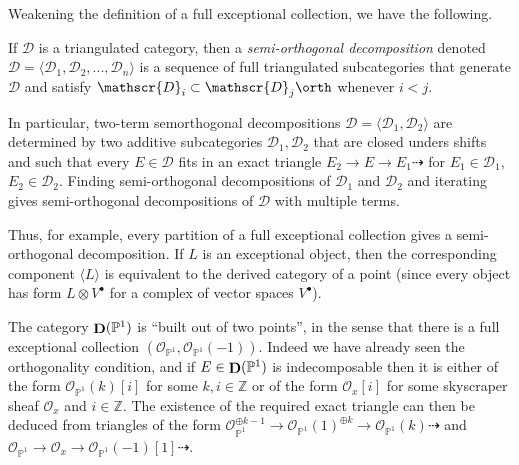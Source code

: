 Weakening the definition of a full exceptional collection, we have the
following.

\begin{definition}
    If \(\mathscr{D}\) is a triangulated category, then a
    \textit{semi-orthogonal decomposition} denoted \(\mathscr{D}=\langle
    \mathscr{D}_1,\mathscr{D}_2,...,\mathscr{D}_n\rangle\) is a sequence of full
    triangulated subcategories that generate \(\mathscr{D}\) and satisfy
    \(\mathscr{D}_i\subset \mathscr{D}_j\orth\) whenever \(i<j\).
\end{definition}

In particular, two-term semorthogonal decompositions \(\mathscr{D}=\langle
\mathscr{D}_1,\mathscr{D}_2\rangle\) are determined by two additive subcategories
\(\mathscr{D}_1,\mathscr{D}_2\) that are closed unders shifts and such that
every \(E\in \mathscr{D}\) fits in an exact triangle \( E_2\to E\to
E_1\dashrightarrow\) for \(E_1\in \mathscr{D}_1\), \(E_2\in \mathscr{D}_2\). Finding
semi-orthogonal decompositions of \(\mathscr{D}_1\) and \(\mathscr{D}_2\) and
iterating gives semi-orthogonal decompositions of \(\mathscr{D}\) with
multiple terms.

Thus, for example, every partition of a full exceptional collection gives a
semi-orthogonal decomposition. If \(L\) is an exceptional object, then the
corresponding component \(\langle L \rangle\) is equivalent to the derived
category of a point (since every object has form \(L\otimes V^\bullet\) for a
complex of vector spaces \(V^\bullet\)).

\begin{example}
    The category \(\mathop{\mathbf{D}}(\mathbb{P}^1)\) is ``built out of two points'', in the
    sense that there is a full exceptional collection
    \((\mathscr{O}_{\mathbb{P}^1},\mathscr{O}_{\mathbb{P}^1}(-1))\).  Indeed we
    have already seen the orthogonality condition, and if \(E\in
    \mathop{\mathbf{D}}(\mathbb{P}^1)\) is indecomposable then it is either of the form
    \(\mathscr{O}_{\mathbb{P}^1}(k)[i]\) for some \(k,i\in \mathbb{Z}\) or of
    the form \(\mathscr{O}_x[i]\) for some skyscraper sheaf \(\mathscr{O}_x\)
    and \(i\in \mathbb{Z}\). The existence of the required exact triangle can
    then be deduced from triangles of the form
    \(\mathscr{O}_{\mathbb{P}^1}^{\oplus k-1}\to
    \mathscr{O}_{\mathbb{P}^1}(1)^{\oplus k} \to
    \mathscr{O}_{\mathbb{P}^1}(k)\dashrightarrow\) and \(
    \mathscr{O}_{\mathbb{P}^1}\to \mathscr{O}_x\to
    \mathscr{O}_{\mathbb{P}^1}(-1)[1]\dashrightarrow\).
\end{example}

